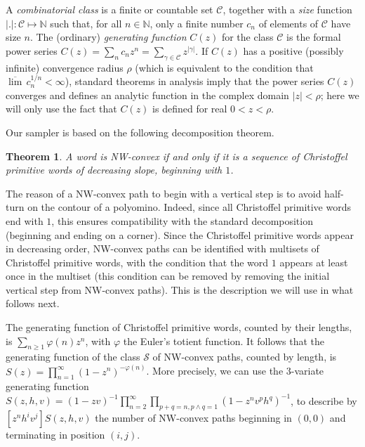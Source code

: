 \documentclass{article}
\newtheorem{theorem}{Theorem}[section]
\begin{document}
A \emph{combinatorial class} is a finite or countable set
$\mathcal{C}$, together with a \emph{size} function $|.|:
\mathcal{C}\mapsto \mathbb{N}$ such that, for all $n\in\mathbb{N}$,
only a finite number $c_n$ of elements of $\mathcal{C}$ have size $n$.
The (ordinary) \emph{generating function} $C(z)$ for the class
$\mathcal{C}$ is the formal power series $C(z) = \sum_{n} c_n z^n =
\sum_{\gamma\in\mathcal{C}} z^{|\gamma|}$. If $C(z)$ has a positive
(possibly infinite) convergence radius $\rho$ (which is equivalent to
the condition that $\overline{\lim}\, c_n^{1/n} < \infty$), standard
theorems in analysis imply that the power series $C(z)$ converges and
defines an analytic function in the complex domain $|z|<\rho$; here we
will only use the fact that $C(z)$ is defined for real $0<z<\rho$.




Our sampler is based on the following decomposition theorem. 


\begin{theorem}\cite{Brlek09a}
A word is NW-convex if and only if it is a sequence of Christoffel primitive words of decreasing slope, beginning with $1$.
\end{theorem}

The reason of a NW-convex path to begin with a vertical step is to
avoid half-turn on the contour of a polyomino. Indeed, since all
Christoffel primitive words end with $1$, this ensures compatibility
with the standard decomposition (beginning and ending on a
corner).  Since the Christoffel primitive words appear in
decreasing order, NW-convex paths can be identified with multisets
of Christoffel primitive words, with the condition that the word
$1$ appears at least once in the multiset (this condition can be
removed by removing the initial vertical step from NW-convex
paths).  This is the description we will use in what follows
next.

The generating function of Christoffel primitive words, counted by
their lengths, is $\sum\limits_{n\geq1}\varphi(n)z^n$, with
$\varphi$ the Euler's totient function. It follows \cite[p.~29]{Flajolet2009}
that the
generating function of the class $\mathcal{S}$ of NW-convex paths,
counted by length, is $S(z)=\prod\limits_{n=1}^{\infty}
(1-z^{n})^{-\varphi(n)}$. More precisely, we can use the 3-variate generating function 
$S(z,h,v)=(1-zv)^{-1}\prod\limits_{n=2}^{\infty}\prod\limits_{p+q=n, p\wedge q=1}
(1-z^{n}v^ph^q)^{-1}$, to describe by $[z^nh^iv^j]S(z,h,v)$ the number of NW-convex paths beginning in $(0,0)$ and terminating in position $(i,j)$.
\end{document}
